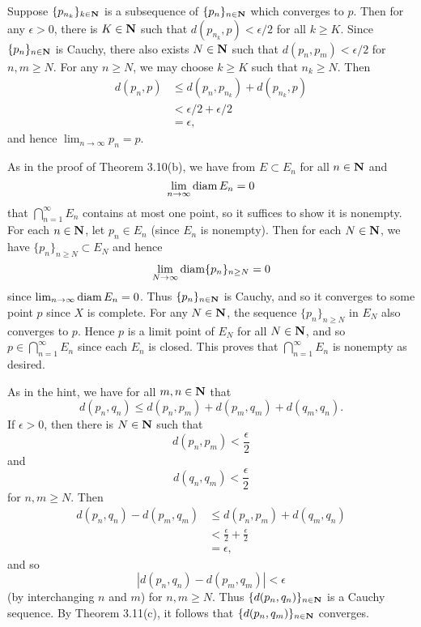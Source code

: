\begin{ex}
Suppose $\{p_{n_k}\}_{k \in \mathbf{N}}$ is a subsequence of $\{p_n\}_{n \in \mathbf{N}}$ which converges to $p$. Then for any $\epsilon > 0$, there is $K \in \mathbf{N}$ such that $d(p_{n_k}, p) < \epsilon/2$ for all $k \geq K$. Since $\{p_n\}_{n \in \mathbf{N}}$ is Cauchy, there also exists $N \in \mathbf{N}$ such that $d(p_n, p_m) < \epsilon/2$ for $n, m \geq N$. For any $n \geq N$, we may choose $k \geq K$ such that $n_k \geq N$. Then
\begin{align*}
d(p_n, p) & \leq d(p_n, p_{n_k}) + d(p_{n_k}, p)\\
& < \epsilon/2 + \epsilon/2\\
& = \epsilon,
\end{align*}
and hence $\lim_{n\to\infty}p_n = p$.
\end{ex}

\begin{ex}
As in the proof of Theorem 3.10(b), we have from $E \subset E_n$ for all $n \in \mathbf{N}$ and \[\lim_{n\to\infty}\operatorname{diam} E_n = 0\] that $\bigcap_{n = 1}^{\infty}E_n$ contains at most one point, so it suffices to show it is nonempty. For each $n \in \mathbf{N}$, let $p_n \in E_n$ (since $E_n$ is nonempty). Then for each $N \in \mathbf{N}$, we have $\{p_n\}_{n \geq N} \subset E_N$ and hence \[\lim_{N\to\infty}\operatorname{diam}\{p_n\}_{n \geq N} = 0\] since $\lim_{n\to\infty}\operatorname{diam} E_n = 0$. Thus $\{p_n\}_{n \in \mathbf{N}}$ is Cauchy, and so it converges to some point $p$ since $X$ is complete. For any $N \in \mathbf{N}$, the sequence $\{p_n\}_{n \geq N}$ in $E_N$ also converges to $p$. Hence $p$ is a limit point of $E_N$ for all $N \in \mathbf{N}$, and so $p \in \bigcap_{n = 1}^{\infty}E_n$ since each $E_n$ is closed. This proves that $\bigcap_{n = 1}^{\infty}E_n$ is nonempty as desired.
\end{ex}

\begin{ex}

\end{ex}

\begin{ex}
As in the hint, we have for all $m, n \in \mathbf{N}$ that \[d(p_n, q_n) \leq d(p_n, p_m) + d(p_m, q_m) + d(q_m, q_n).\] If $\epsilon > 0$, then there is $N \in \mathbf{N}$ such that \[d(p_n, p_m) < \frac{\epsilon}{2}\] and \[d(q_n, q_m) < \frac{\epsilon}{2}\] for $n, m \geq N$. Then
\begin{align*}
d(p_n, q_n) - d(p_m, q_m) & \leq d(p_n, p_m) + d(q_m, q_n)\\
& < \frac{\epsilon}{2} + \frac{\epsilon}{2}\\
& = \epsilon,
\end{align*}
and so \[|d(p_n, q_n) - d(p_m, q_m)| < \epsilon\] (by interchanging $n$ and $m$) for $n, m \geq N$. Thus $\{d(p_n, q_n)\}_{n \in \mathbf{N}}$ is a Cauchy sequence. By Theorem 3.11(c), it follows that $\{d(p_n, q_m)\}_{n \in \mathbf{N}}$ converges.
\end{ex}

